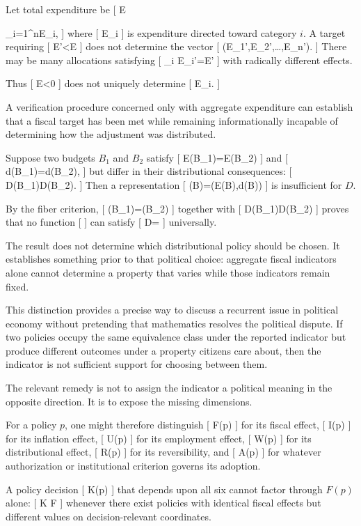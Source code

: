 \documentclass[11pt]{article}
\begin{document}
Let total expenditure be
[
E

\sum_{i=1}^{n}E_i,
]
where
[
E_i
]
is expenditure directed toward category $i$. A target requiring
[
E'<E
]
does not determine the vector
[
(E_1',E_2',\ldots,E_n').
]
There may be many allocations satisfying
[
\sum_i E_i'=E'
]
with radically different effects.

Thus
[
\Delta E<0
]
does not uniquely determine
[
\Delta E_i.
]

A verification procedure concerned only with aggregate expenditure can establish that a fiscal target has been met while remaining informationally incapable of determining how the adjustment was distributed.

Suppose two budgets $B_1$ and $B_2$ satisfy
[
E(B_1)=E(B_2)
]
and
[
d(B_1)=d(B_2),
]
but differ in their distributional consequences:
[
D(B_1)\neq D(B_2).
]
Then a representation
[
\pi(B)=(E(B),d(B))
]
is insufficient for $D$.

By the fiber criterion,
[
\pi(B_1)=\pi(B_2)
]
together with
[
D(B_1)\neq D(B_2)
]
proves that no function
[
]
can satisfy
[
D=\circ\pi
]
universally.

The result does not determine which distributional policy should be chosen. It establishes something prior to that political choice: aggregate fiscal indicators alone cannot determine a property that varies while those indicators remain fixed.

This distinction provides a precise way to discuss a recurrent issue in political economy without pretending that mathematics resolves the political dispute. If two policies occupy the same equivalence class under the reported indicator but produce different outcomes under a property citizens care about, then the indicator is not sufficient support for choosing between them.

The relevant remedy is not to assign the indicator a political meaning in the opposite direction. It is to expose the missing dimensions.

For a policy $p$, one might therefore distinguish
[
F(p)
]
for its fiscal effect,
[
I(p)
]
for its inflation effect,
[
U(p)
]
for its employment effect,
[
W(p)
]
for its distributional effect,
[
R(p)
]
for its reversibility, and
[
A(p)
]
for whatever authorization or institutional criterion governs its adoption.

A policy decision
[
K(p)
]
that depends upon all six cannot factor through $F(p)$ alone:
[
K
\neq
{}\circ F
]
whenever there exist policies with identical fiscal effects but different values on decision-relevant coordinates.
\end{document}
